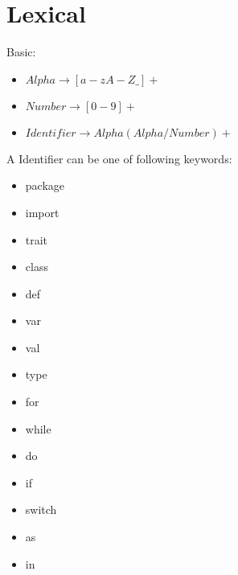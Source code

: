 \section{Lexical}
Basic:

\begin{itemize}
\item $Alpha \rightarrow [a-zA-Z\_]+$
\item $Number \rightarrow [0-9]+$
\item $Identifier \rightarrow Alpha (Alpha / Number)+$
\end{itemize}

A Identifier can be one of following keywords:
\begin{multicols}{4}
\begin{itemize}
\item package 
\item import
\item trait 
\item class 
\item def 
\item var 
\item val 
\item type 
\item for 
\item while 
\item do 
\item if 
\item switch 
\item as
\item in
\end{itemize}
\end{multicols}

